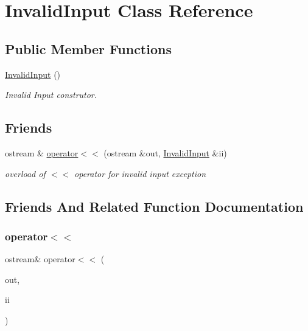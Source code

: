 \hypertarget{class_invalid_input}{}\section{Invalid\+Input Class Reference}
\label{class_invalid_input}
\subsection*{Public Member Functions}
\begin{DoxyCompactItemize}
\item 
\hypertarget{class_invalid_input_af91e4c208e27397ac4d2c88fd8f23489}{}\label{class_invalid_input_af91e4c208e27397ac4d2c88fd8f23489} 
\hyperlink{class_invalid_input_af91e4c208e27397ac4d2c88fd8f23489}{Invalid\+Input} ()
\begin{DoxyCompactList}\small\item\em Invalid Input construtor. \end{DoxyCompactList}\end{DoxyCompactItemize}
\subsection*{Friends}
\begin{DoxyCompactItemize}
\item 
ostream \& \hyperlink{class_invalid_input_a6ecc3c0d128c8411aa7a7d336191c9e3}{operator$<$$<$} (ostream \&out, \hyperlink{class_invalid_input}{Invalid\+Input} \&ii)
\begin{DoxyCompactList}\small\item\em overload of $<$$<$ operator for invalid input exception \end{DoxyCompactList}\end{DoxyCompactItemize}


\subsection{Friends And Related Function Documentation}
\hypertarget{class_invalid_input_a6ecc3c0d128c8411aa7a7d336191c9e3}{}\label{class_invalid_input_a6ecc3c0d128c8411aa7a7d336191c9e3} 
\subsubsection{\texorpdfstring{operator$<$$<$}{operator<<}}
{\footnotesize\ttfamily ostream\& operator$<$$<$ (\begin{DoxyParamCaption}\item[{ostream \&}]{out,  }\item[{\hyperlink{class_invalid_input}{Invalid\+Input} \&}]{ii }\end{DoxyParamCaption})\hspace{0.3cm}{\ttfamily [friend]}}




